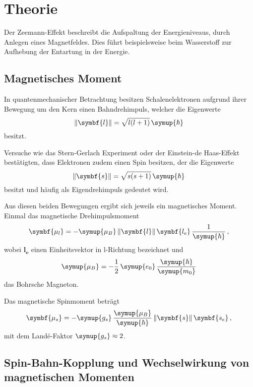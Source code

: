 \section{Theorie}
\label{sec:Theorie}

Der Zeemann-Effekt beschreibt die Aufspaltung der Energieniveaus,
durch Anlegen eines Magnetfeldes. Dies führt beispielsweise beim Wasserstoff
zur Aufhebung der Entartung in der Energie.

\subsection{Magnetisches Moment}
In quantenmechanischer Betrachtung besitzen Schalenelektronen aufgrund ihrer
Bewegung um den Kern einen Bahndrehimpuls, welcher die Eigenwerte
\begin{equation}
\norm{\symbf{l}}=\sqrt{l(l+1)} \, \symup{\hbar}
\end{equation}
besitzt.

Versuche wie das Stern-Gerlach Experiment oder der Einstein-de Haas-Effekt
bestätigten, dass Elektronen zudem einen Spin besitzen, der die Eigenwerte
\begin{equation}
\norm{\symbf{s}}=\sqrt{s(s+1)} \, \symup{\hbar}
\end{equation}
besitzt und häufig als Eigendrehimpuls gedeutet wird.

Aus diesen beiden Bewegungen ergibt sich jeweils ein magnetisches Moment.
Einmal das magnetische Drehimpulsmoment
\begin{equation}
\symbf{\mu_l}=-\symup{\mu_B} \, \norm{\symbf{l}} \, \symbf{l_e} \, \frac{1}{\symup{\hbar}} \, ,
\end{equation}
wobei $\symbf{l_e}$ einen Einheitsvektor in l-Richtung bezeichnet und
\begin{equation}
\symup{\mu_B} = -\frac{1}{2} \, \symup{e_0} \, \frac{\symup{\hbar}}{\symup{m_0}}
\end{equation}
das Bohrsche Magneton.


Das magnetische Spinmoment beträgt
\begin{equation}
\symbf{\mu_s}=-\symup{g_s} \, \frac{\symup{\mu_B}}{\symup{\hbar}} \, \norm{\symbf{s}} \, \symbf{s_e} \, ,
\end{equation}
mit dem Landé-Faktor $\symup{g_s} \approx 2$.

\subsection{Spin-Bahn-Kopplung und Wechselwirkung von magnetischen Momenten}

